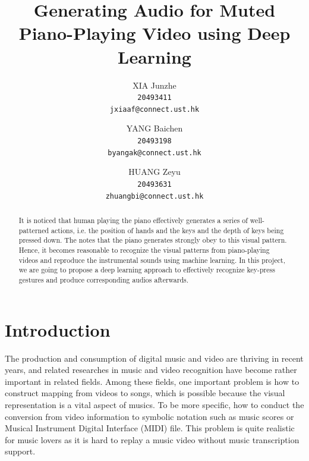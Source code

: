 \documentclass[10pt,twocolumn,letterpaper]{article}
\begin{document}
\title{Generating Audio for Muted Piano-Playing Video using Deep Learning}

\author{XIA Junzhe\\
{\tt\small 20493411}\\
{\tt\small jxiaaf@connect.ust.hk}
\and
YANG Baichen\\
{\tt\small 20493198}\\
{\tt\small byangak@connect.ust.hk}
\and
HUANG Zeyu\\
{\tt\small 20493631}\\
{\tt\small zhuangbi@connect.ust.hk}
}

\maketitle

%

\begin{abstract}
   It is noticed that human playing the piano effectively generates a series of well-patterned actions, i.e. the position of hands and the keys and the depth of keys being pressed down. 
   The notes that the piano generates strongly obey to this visual pattern. 
   Hence, it becomes reasonable to recognize the visual patterns from piano-playing videos and reproduce the instrumental sounds using machine learning.
   In this project, we are going to propose a deep learning approach to effectively recognize key-press gestures and produce corresponding audios afterwards.
   
\end{abstract}

\section{Introduction}
\label{Introduction}
   The production and consumption of digital music and video are thriving in recent years, and related researches in music and video recognition have become rather important in related fields.
   Among these fields, one important problem is how to construct mapping from videos to songs, which is possible because the visual representation is a vital aspect of musics.
   To be more specific, how to conduct the conversion from video information to symbolic notation such as music scores or Musical Instrument Digital Interface (MIDI) file.
   This problem is quite realistic for music lovers as it is hard to replay a music video without music transcription support.
   
\end{document}
